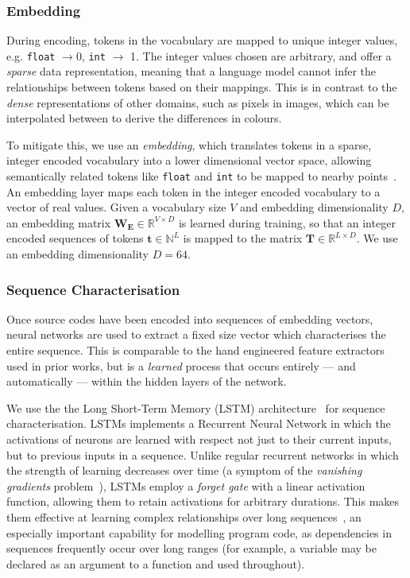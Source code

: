 

\subsubsection{Embedding} During encoding, tokens in the vocabulary are mapped to unique integer values, e.g. \texttt{float} $\rightarrow 0$, \texttt{int} $\rightarrow$ 1. The integer values chosen are arbitrary, and offer a \emph{sparse} data representation, meaning that a language model cannot infer the relationships between tokens based on their mappings. This is in contrast to the \emph{dense} representations of other domains, such as pixels in images, which can be interpolated between to derive the differences in colours.

To mitigate this, we use an \emph{embedding}, which translates tokens in a sparse, integer encoded vocabulary into a lower dimensional vector space, allowing semantically related tokens like \texttt{float} and \texttt{int} to be mapped to nearby points~\cite{Mikolov2013a,Baroni2014}. An embedding layer maps each token in the integer encoded vocabulary to a vector of real values. Given a vocabulary size $V$ and embedding dimensionality $D$, an embedding matrix $\bm{W_{E}} \in \mathbb{R}^{V \times D}$ is learned during training, so that an integer encoded sequences of tokens $\bm{t} \in \mathbb{N}^{L}$ is mapped to the matrix $\bm{T} \in \mathbb{R}^{L \times D}$. We use an embedding dimensionality $D = 64$.

\subsubsection{Sequence Characterisation} Once source codes have been encoded into sequences of embedding vectors, neural networks are used to extract a fixed size vector which characterises the entire sequence. This is comparable to the hand engineered feature extractors used in prior works, but is a \emph{learned} process that occurs entirely --- and automatically --- within the hidden layers of the network.

We use the the Long Short-Term Memory (LSTM) architecture~\cite{Hochreiter1997} for sequence characterisation. LSTMs implements a Recurrent Neural Network in which the activations of neurons are learned with respect not just to their current inputs, but to previous inputs in a sequence. Unlike regular recurrent networks in which the strength of learning decreases over time (a symptom of the \emph{vanishing gradients} problem~\cite{Pacanu2013}), LSTMs employ a \emph{forget gate} with a linear activation function, allowing them to retain activations for arbitrary durations. This makes them effective at learning complex relationships over long sequences~\cite{Lipton2015}, an especially important capability for modelling program code, as dependencies in sequences frequently occur over long ranges (for example, a variable may be declared as an argument to a function and used throughout).

